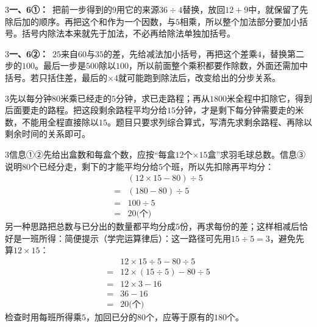 \documentclass[multi=snippet,border={5bp 20bp 5bp 5bp}]{standalone}
\newenvironment{snippet}[3]{\begin{minipage}{#1bp}\color{answerred}\fontsize{#2}{#3}\selectfont\raggedright}{\end{minipage}}
\begin{document}
\begin{snippet}{505}{11.5}{14}\begin{multicols}{3}\raggedcolumns \textbf{一、6①：}\ 把前一步得到的\(9\)\allowbreak 用它的来源\(36\div4\)\allowbreak 替换，放回\(12+9\)\allowbreak 中，就保留了先除后加的顺序。再把这个和作为一个因数，与\(5\)\allowbreak 相乘，所以整个加法部分要加小括号。括号内除法本来就先于加法，不必再给除法单独加括号。\end{multicols}\end{snippet}
\begin{snippet}{505}{11.5}{14}\begin{multicols}{3}\raggedcolumns \textbf{一、6②：}\ \(25\)\allowbreak 来自\(60\)\allowbreak 与\(35\)\allowbreak 的差，先给减法加小括号，再把这个差乘\(4\)\allowbreak ，替换第二步的\(100\)\allowbreak 。最后一步是\(500\)\allowbreak 除以\(100\)\allowbreak ，所以前面整个乘积都要作除数，外面还需加中括号。若只括住差，最后的\(\times4\)\allowbreak 就可能跑到除法后，改变给出的分步关系。\end{multicols}\end{snippet}
\begin{snippet}{505}{11.5}{14}\begin{multicols}{3}\raggedcolumns 先以每分钟\(80\)\allowbreak 米乘已经走的\(5\)\allowbreak 分钟，求已走路程；再从\(1800\)\allowbreak 米全程中扣除它，得到后面要走的路程。把这段剩余路程平均分给\(15\)\allowbreak 分钟，才是剩下每分钟需要走的米数，不能用全程直接除以\(15\)\allowbreak 。题目只要求列综合算式，写清先求剩余路程、再除以剩余时间的关系即可。\end{multicols}\end{snippet}
\begin{snippet}{505}{11.5}{14}\begin{multicols}{3}\raggedcolumns 信息①②先给出盒数和每盒个数，应按“每盒\(12\)\allowbreak 个\(\times15\)\allowbreak 盒”求羽毛球总数。信息③说明\(80\)\allowbreak 个已经分走，剩下的才能平均分给\(5\)\allowbreak 个班，所以先扣除再平均分：\[\begin{aligned}&(12\times15-80)\div5\\={}&(180-80)\div5\\={}&100\div5\\={}&20\text{(个)}\end{aligned}\]另一种思路把总数与已分出的数量都平均分成\(5\)\allowbreak 份，再求每份的差；这样相减后恰好是一班所得：简便提示（学完运算律后）：这一路径可先用\(15\div5=3\)\allowbreak ，避免先算\(12\times15\)\allowbreak ：\[\begin{aligned}&12\times15\div5-80\div5\\={}&12\times(15\div5)-80\div5\\={}&12\times3-16\\={}&36-16\\={}&20\text{(个)}\end{aligned}\]检查时用每班所得乘\(5\)\allowbreak ，加回已分的\(80\)\allowbreak 个，应等于原有的\(180\)\allowbreak 个。\end{multicols}\end{snippet}
\end{document}
